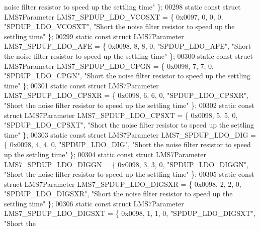 \begin{DoxyCode}
{       noise filter resistor to speed up the settling time"} \};
00298 \textcolor{keyword}{static} \textcolor{keyword}{const} \textcolor{keyword}{struct }LMS7Parameter LMS7_SPDUP_LDO_VCOSXT = \{ 0x0097, 0, 0, 0, \textcolor{stringliteral}{"SPDUP\_LDO\_VCOSXT"}, \textcolor{stringliteral}{"Short the
       noise filter resistor to speed up the settling time"} \};
00299 \textcolor{keyword}{static} \textcolor{keyword}{const} \textcolor{keyword}{struct }LMS7Parameter LMS7_SPDUP_LDO_AFE = \{ 0x0098, 8, 8, 0, \textcolor{stringliteral}{"SPDUP\_LDO\_AFE"}, \textcolor{stringliteral}{"Short the noise
       filter resistor to speed up the settling time"} \};
00300 \textcolor{keyword}{static} \textcolor{keyword}{const} \textcolor{keyword}{struct }LMS7Parameter LMS7_SPDUP_LDO_CPGN = \{ 0x0098, 7, 7, 0, \textcolor{stringliteral}{"SPDUP\_LDO\_CPGN"}, \textcolor{stringliteral}{"Short the
       noise filter resistor to speed up the settling time"} \};
00301 \textcolor{keyword}{static} \textcolor{keyword}{const} \textcolor{keyword}{struct }LMS7Parameter LMS7_SPDUP_LDO_CPSXR = \{ 0x0098, 6, 6, 0, \textcolor{stringliteral}{"SPDUP\_LDO\_CPSXR"}, \textcolor{stringliteral}{"Short the
       noise filter resistor to speed up the settling time"} \};
00302 \textcolor{keyword}{static} \textcolor{keyword}{const} \textcolor{keyword}{struct }LMS7Parameter LMS7_SPDUP_LDO_CPSXT = \{ 0x0098, 5, 5, 0, \textcolor{stringliteral}{"SPDUP\_LDO\_CPSXT"}, \textcolor{stringliteral}{"Short the
       noise filter resistor to speed up the settling time"} \};
00303 \textcolor{keyword}{static} \textcolor{keyword}{const} \textcolor{keyword}{struct }LMS7Parameter LMS7_SPDUP_LDO_DIG = \{ 0x0098, 4, 4, 0, \textcolor{stringliteral}{"SPDUP\_LDO\_DIG"}, \textcolor{stringliteral}{"Short the noise
       filter resistor to speed up the settling time"} \};
00304 \textcolor{keyword}{static} \textcolor{keyword}{const} \textcolor{keyword}{struct }LMS7Parameter LMS7_SPDUP_LDO_DIGGN = \{ 0x0098, 3, 3, 0, \textcolor{stringliteral}{"SPDUP\_LDO\_DIGGN"}, \textcolor{stringliteral}{"Short the
       noise filter resistor to speed up the settling time"} \};
00305 \textcolor{keyword}{static} \textcolor{keyword}{const} \textcolor{keyword}{struct }LMS7Parameter LMS7_SPDUP_LDO_DIGSXR = \{ 0x0098, 2, 2, 0, \textcolor{stringliteral}{"SPDUP\_LDO\_DIGSXR"}, \textcolor{stringliteral}{"Short the
       noise filter resistor to speed up the settling time"} \};
00306 \textcolor{keyword}{static} \textcolor{keyword}{const} \textcolor{keyword}{struct }LMS7Parameter LMS7_SPDUP_LDO_DIGSXT = \{ 0x0098, 1, 1, 0, \textcolor{stringliteral}{"SPDUP\_LDO\_DIGSXT"}, \textcolor{stringliteral}{"Short the
}
\end{DoxyCode}
